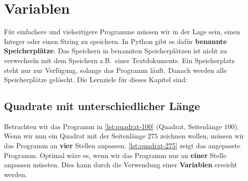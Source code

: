 
\toggletrue{image}
\toggletrue{imagehover}


\chapter{Variablen}
\label{ch:variablen}

Für einfachere und vielseitigere Programme müssen wir in der Lage sein, einen Integer oder einen String zu speichern. In Python gibt es dafür \textbf{benannte Speicherplätze}. Das Speichern in benannten Speicherplätzen ist nicht zu verwechseln mit dem Speichern z.B.\ eines Textdokuments. Ein Speicherplatz steht nur zur Verfügung, solange das Programm läuft. Danach werden alle Speicherplätze gelöscht. Die Lernziele für dieses Kapitel sind:\\


\section{Quadrate mit unterschiedlicher Länge}
\label{sec:quadrate-mit-unterschiedlicher-laenge}

Betrachten wir das Programm in \autoref{lst:quadrat-100} (Quadrat, Seitenlänge $100$). Wenn wir nun ein Quadrat mit der Seitenlänge $275$ zeichnen wollen, müssen wir das Programm an \textbf{vier} Stellen anpassen. \autoref{lst:quadrat-275} zeigt das angepasste Programm. Optimal wäre es, wenn wir das Programm nur an \textbf{einer} Stelle anpassen müssten. Dies kann durch die Verwendung einer \textbf{Variablen} erreicht werden.

